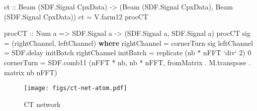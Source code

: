 \documentclass[
  a4paper,
]{article}
\newenvironment{Shaded}{}{}
\newcommand{\DataTypeTok}[1]{\textcolor[rgb]{0.56,0.13,0.00}{#1}}
\newcommand{\DecValTok}[1]{\textcolor[rgb]{0.25,0.63,0.44}{#1}}
\newcommand{\FunctionTok}[1]{\textcolor[rgb]{0.02,0.16,0.49}{#1}}
\newcommand{\KeywordTok}[1]{\textcolor[rgb]{0.00,0.44,0.13}{\textbf{#1}}}
\newcommand{\NormalTok}[1]{#1}
\newcommand{\OtherTok}[1]{\textcolor[rgb]{0.00,0.44,0.13}{#1}}
\begin{document}
\begin{Shaded}
\begin{Highlighting}[numbers=left,,firstnumber=273,]
\OtherTok{ct ::} \DataTypeTok{Beam}\NormalTok{ (}\DataTypeTok{SDF.Signal} \DataTypeTok{CpxData}\NormalTok{)}
   \OtherTok{->}\NormalTok{ (}\DataTypeTok{Beam}\NormalTok{ (}\DataTypeTok{SDF.Signal} \DataTypeTok{CpxData}\NormalTok{),}
       \DataTypeTok{Beam}\NormalTok{ (}\DataTypeTok{SDF.Signal} \DataTypeTok{CpxData}\NormalTok{))}
\NormalTok{ct }\FunctionTok{=}\NormalTok{ V.farm12 procCT}

\OtherTok{procCT ::} \DataTypeTok{Num}\NormalTok{ a }\OtherTok{=>} \DataTypeTok{SDF.Signal}\NormalTok{ a }\OtherTok{->}\NormalTok{ (}\DataTypeTok{SDF.Signal}\NormalTok{ a, }\DataTypeTok{SDF.Signal}\NormalTok{ a)}
\NormalTok{procCT sig }\FunctionTok{=}\NormalTok{ (rightChannel, leftChannel)}
  \KeywordTok{where}
\NormalTok{    rightChannel }\FunctionTok{=}\NormalTok{ cornerTurn sig}
\NormalTok{    leftChannel  }\FunctionTok{=}\NormalTok{ SDF.delay initBatch rightChannel}
\NormalTok{    initBatch    }\FunctionTok{=} \FunctionTok{replicate}\NormalTok{ (nb }\FunctionTok{*}\NormalTok{ nFFT }\OtherTok{`div`} \DecValTok{2}\NormalTok{) }\DecValTok{0}
\NormalTok{    cornerTurn   }\FunctionTok{=}\NormalTok{ SDF.comb11 (nFFT }\FunctionTok{*}\NormalTok{ nb, nb }\FunctionTok{*}\NormalTok{ nFFT,}
\NormalTok{                               fromMatrix }\FunctionTok{.}\NormalTok{ M.transpose }\FunctionTok{.}\NormalTok{ matrix nb nFFT)}
\end{Highlighting}
\end{Shaded}

\begin{figure}
\hypertarget{fig:ct-net-atom}{%
\centering
\texttt{[image: figs/ct-net-atom.pdf]}
\caption{CT network}\label{fig:ct-net-atom}
}
\end{figure}
\end{document}
